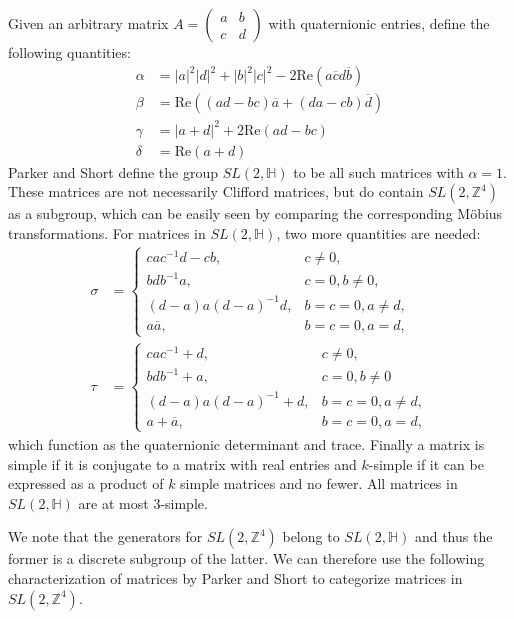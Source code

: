 \documentclass[reqno,10pt]{amsart}
\newcommand{\Z}{\mathbb{Z}}
\newcommand{\norm}[1]{\left\vert #1 \right \vert}
\renewcommand{\Re}{\text{Re}}
\numberwithin{thm}{section}
\theoremstyle{definition}
\theoremstyle{definition}
\numberwithin{equation}{section}
\begin{document}
Given an arbitrary matrix $A=\begin{pmatrix} a & b \\ c & d \end{pmatrix}$ with quaternionic entries, define the following quantities:
\begin{align*}
    \alpha &= \norm{a}^2\norm{d}^2+\norm{b}^2\norm{c}^2-2 \Re(a\overline{c}d\overline{b})\\
    \beta &= \Re\left((ad-bc)\overline{a}+(da-cb)\overline{d}   \right)\\
    \gamma &= \norm{a+d}^2+2\Re(ad-bc)\\
    \delta &= \Re(a+d)
\end{align*}
Parker and Short define the group $SL(2,\mathbb{H})$ to be all such matrices with $\alpha=1$. These matrices are not necessarily Clifford matrices, but do contain $SL(2,\Z^4)$ as a subgroup, which can be easily seen by comparing the corresponding M\"{o}bius transformations.  For matrices in $SL(2,\mathbb{H})$, two more quantities are needed:
\begin{align*}
\sigma &= \begin{cases}
cac^{-1}d-cb, & c\neq 0,\\
bdb^{-1}a, & c=0,b\neq 0,\\
(d-a)a(d-a)^{-1}d, & b=c=0, a\neq d,\\
a\overline{a}, & b=c=0,a=d,
\end{cases}\\
\tau &= \begin{cases}
cac^{-1}+d, & c\neq 0,\\
bdb^{-1}+a, & c=0, b\neq 0\\
(d-a)a(d-a)^{-1}+d, & b=c=0,a\neq d,\\
a+\overline{a}, & b=c=0, a=d,
\end{cases}
\end{align*}
which function as the quaternionic determinant and trace. Finally a matrix is simple if it is conjugate to a matrix with real entries and $k$-simple if it can be expressed as a product of $k$ simple matrices and no fewer. All matrices in $SL(2,\mathbb{H})$ are at most $3$-simple.

We note that the generators for $SL(2,\Z^4)$ belong to $SL(2,\mathbb{H})$ and thus the former is a discrete subgroup of the latter. We can therefore use the following characterization of matrices by Parker and Short to categorize matrices in $SL(2,\Z^4)$.
\end{document}
